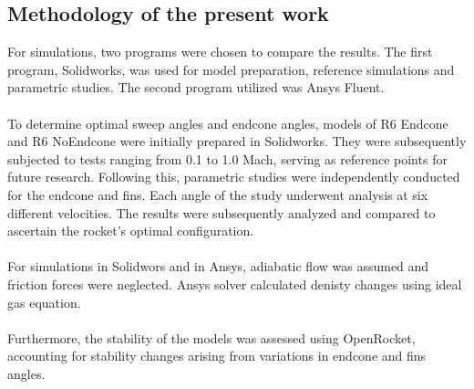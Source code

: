 \documentclass{article}
\begin{document}

\subsection{Methodology of the present work}
For simulations, two programs were chosen to compare the results. The first program, 
Solidworks, was used for model preparation, reference simulations and parametric studies. The second 
program utilized was Ansys Fluent.\\\\
To determine optimal sweep angles and endcone angles, models of R6 Endcone and R6 NoEndcone were 
initially prepared in Solidworks. They were subsequently subjected to tests ranging from 0.1 to 1.0 
Mach, serving as reference points for future research. Following this, parametric studies were 
independently conducted for the endcone and fins. Each angle of the study underwent analysis at 
six different velocities. The results were subsequently analyzed and compared to ascertain the 
rocket's optimal configuration.\\\\
For simulations in Solidwors and in Ansys, adiabatic flow was assumed and friction forces were
neglected. Ansys solver calculated denisty changes using ideal gas equation.\\\\
Furthermore, the stability of the models was assessed using OpenRocket, accounting for 
stability changes arising from variations in endcone and fins angles.
\end{document}
